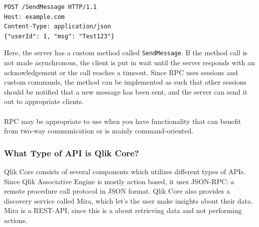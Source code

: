 \documentclass{article}
\begin{document}
\begin{lstlisting}
POST /SendMessage HTTP/1.1
Host: example.com
Content-Type: application/json
{"userId": 1, "msg": "Test123"}
\end{lstlisting}

Here, the server has a custom method called \texttt{SendMessage}. If the
method call is not made asynchronous, the client is put in wait until
the server responds with an acknowledgement or the call reaches a
timeout. Since RPC uses sessions and custom commands, the method can be
implemented as such that other sessions should be notified that a new
message has been sent, and the server can send it out to appropriate
clients.
\\ \\
RPC may be appropriate to use when you have functionality that can
benefit from two-way communication or is mainly command-oriented.

\subsubsection{What Type of API is Qlik Core?}

Qlik Core consists of several components which utilizes different types
of APIs. Since Qlik Associative Engine is mostly action based, it uses
JSON-RPC: a remote procedure call protocol in JSON format. Qlik Core
also provides a discovery service called Mira, which let's the user make
insights about their data. Mira is a REST-API, since this is a about
retrieving data and not performing actions.\cite{qlikwebsite}
\end{document}
